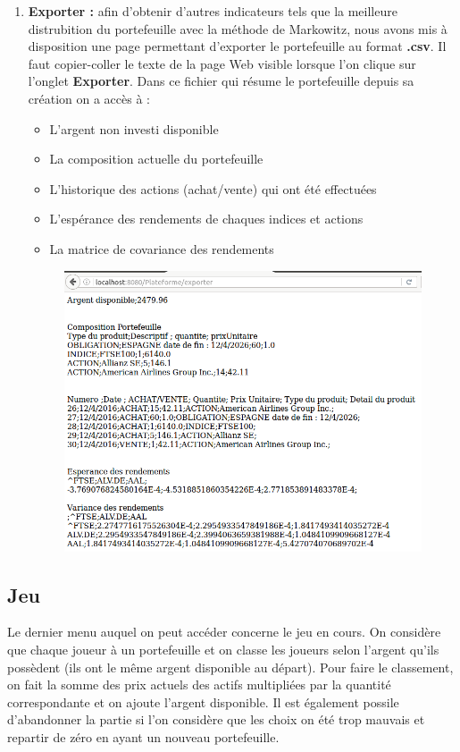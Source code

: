 \begin{enumerate}
\begin{enumerate}
      \end{enumerate}

      \item \textbf{Exporter :} afin d'obtenir d'autres indicateurs tels que la meilleure distrubition du portefeuille avec la méthode de Markowitz, nous avons mis à disposition une page permettant d'exporter le portefeuille au format \textbf{.csv}. Il faut copier-coller le texte de la page Web visible lorsque l'on clique sur l'onglet \textbf{Exporter}. Dans ce fichier qui résume le portefeuille depuis sa création on a accès à :
      \begin{itemize}
       \item L'argent non investi disponible
       \item La composition actuelle du portefeuille
       \item L'historique des actions (achat/vente) qui ont été effectuées
       \item L'espérance des rendements de chaques indices et actions
       \item La matrice de covariance des rendements
      \end{itemize}

      \begin{figure}[H]
	\center	
	\includegraphics[scale=0.5]{../graph/7-exporterpage.png}
      \end{figure}

    \end{enumerate}
  
    \subsection{Jeu}
    Le dernier menu auquel on peut accéder concerne le jeu en cours. On considère que chaque joueur à un portefeuille et on classe les joueurs selon l'argent qu'ils possèdent (ils ont le même argent disponible au départ). Pour faire le classement, on fait la somme des prix actuels des actifs multipliées par la quantité correspondante et on ajoute l'argent disponible. Il est également possile d'abandonner la partie si l'on considère que les choix on été trop mauvais et repartir de zéro en ayant un nouveau portefeuille.
  
